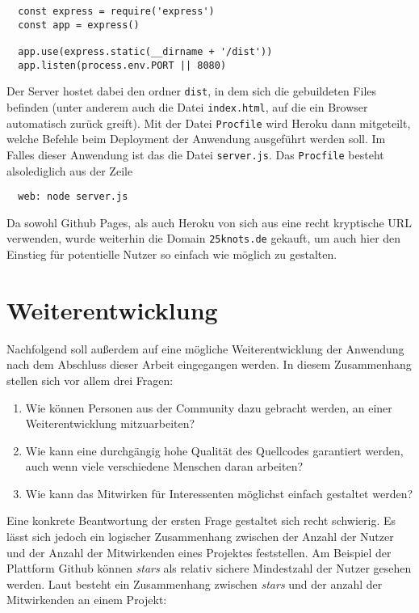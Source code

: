 \begin{lstlisting}
  const express = require('express')
  const app = express()

  app.use(express.static(__dirname + '/dist'))
  app.listen(process.env.PORT || 8080)
\end{lstlisting}

Der Server hostet dabei den ordner \verb|dist|, in dem sich die gebuildeten Files befinden (unter anderem auch die Datei \verb|index.html|, auf die ein Browser automatisch zurück greift). Mit der Datei \verb|Procfile| wird Heroku dann mitgeteilt, welche Befehle beim Deployment der Anwendung ausgeführt werden soll. Im Falles dieser Anwendung ist das die Datei \verb|server.js|. Das \verb|Procfile| besteht alsolediglich aus der Zeile

\begin{lstlisting}
  web: node server.js
\end{lstlisting}

Da sowohl Github Pages, als auch Heroku von sich aus eine recht kryptische URL verwenden, wurde weiterhin die Domain \verb|25knots.de| gekauft, um auch hier den Einstieg für potentielle Nutzer so einfach wie möglich zu gestalten.


\section{Weiterentwicklung}
Nachfolgend soll außerdem auf eine mögliche Weiterentwicklung der Anwendung nach dem Abschluss dieser Arbeit eingegangen werden. In diesem Zusammenhang stellen sich vor allem drei Fragen:
\begin{enumerate}
  \item Wie können Personen aus der Community dazu gebracht werden, an einer Weiterentwicklung mitzuarbeiten?
  \item Wie kann eine durchgängig hohe Qualität des Quellcodes garantiert werden, auch wenn viele verschiedene Menschen daran arbeiten?
  \item Wie kann das Mitwirken für Interessenten möglichst einfach gestaltet werden?
\end{enumerate}

Eine konkrete Beantwortung der ersten Frage gestaltet sich recht schwierig. Es lässt sich jedoch ein logischer Zusammenhang zwischen der Anzahl der Nutzer und der Anzahl der Mitwirkenden eines Projektes feststellen. Am Beispiel der Plattform Github können \textit{stars} als relativ sichere Mindestzahl der Nutzer gesehen werden. Laut \cite{borges2015popularity} besteht ein Zusammenhang zwischen \textit{stars} und der anzahl der Mitwirkenden an einem Projekt:

